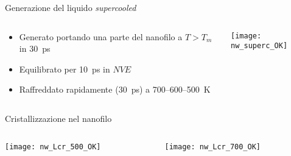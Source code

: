 \documentclass{beamer}
\begin{document}
\begin{frame}{Generazione del liquido \emph{supercooled}}
 \begin{columns}
  \begin{column}{0.5\textwidth}
   \begin{itemize}
    \item Generato portando una parte del nanofilo a $T > T_m$ in \SI{30}{ps}
    \item Equilibrato per \SI{10}{ps} in $NVE$
    \item Raffreddato rapidamente (\SI{30}{ps}) a \num{700}--\num{600}--\SI{500}{K}
   \end{itemize}

  \end{column}
  \begin{column}{0.5\textwidth}
   \texttt{[image: nw\_superc\_OK]}
  \end{column}
 \end{columns}
\end{frame}


\begin{frame}{Cristallizzazione nel nanofilo}
  \begin{columns}
   \begin{column}{0.5\textwidth}
    \texttt{[image: nw\_Lcr\_500\_OK]}
   \end{column}
   \begin{column}{0.5\textwidth}
    \texttt{[image: nw\_Lcr\_700\_OK]}
   \end{column}
  \end{columns}
  \begin{table}[h]
  \end{table}

\end{frame}
\end{document}
